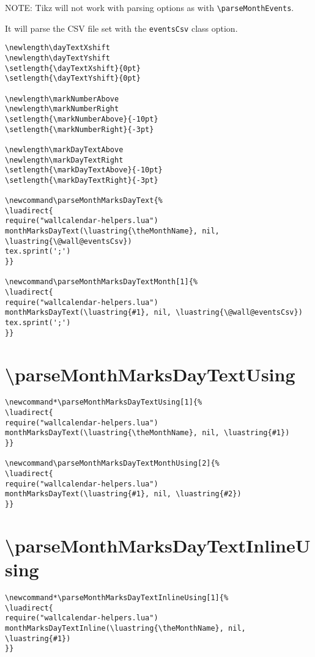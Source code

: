 \documentclass[11pt,oneside]{memoir-article}
\begin{document}
NOTE: Tikz will not work with parsing options as with \texttt{\textbackslash{}parseMonthEvents}.

It will parse the CSV file set with the \texttt{eventsCsv} class option.

\begin{verbatim}
\newlength\dayTextXshift
\newlength\dayTextYshift
\setlength{\dayTextXshift}{0pt}
\setlength{\dayTextYshift}{0pt}

\newlength\markNumberAbove
\newlength\markNumberRight
\setlength{\markNumberAbove}{-10pt}
\setlength{\markNumberRight}{-3pt}

\newlength\markDayTextAbove
\newlength\markDayTextRight
\setlength{\markDayTextAbove}{-10pt}
\setlength{\markDayTextRight}{-3pt}

\newcommand\parseMonthMarksDayText{%
\luadirect{
require("wallcalendar-helpers.lua")
monthMarksDayText(\luastring{\theMonthName}, nil, \luastring{\@wall@eventsCsv})
tex.sprint(';')
}}

\newcommand\parseMonthMarksDayTextMonth[1]{%
\luadirect{
require("wallcalendar-helpers.lua")
monthMarksDayText(\luastring{#1}, nil, \luastring{\@wall@eventsCsv})
tex.sprint(';')
}}
\end{verbatim}

\section{\textbackslash parseMonthMarksDayTextUsing}
\label{sec:org5678f4b}

\begin{verbatim}
\newcommand*\parseMonthMarksDayTextUsing[1]{%
\luadirect{
require("wallcalendar-helpers.lua")
monthMarksDayText(\luastring{\theMonthName}, nil, \luastring{#1})
}}

\newcommand\parseMonthMarksDayTextMonthUsing[2]{%
\luadirect{
require("wallcalendar-helpers.lua")
monthMarksDayText(\luastring{#1}, nil, \luastring{#2})
}}
\end{verbatim}

\section{\textbackslash parseMonthMarksDayTextInlineUsing}
\label{sec:orge406db3}

\begin{verbatim}
\newcommand*\parseMonthMarksDayTextInlineUsing[1]{%
\luadirect{
require("wallcalendar-helpers.lua")
monthMarksDayTextInline(\luastring{\theMonthName}, nil, \luastring{#1})
}}
\end{verbatim}
\end{document}
